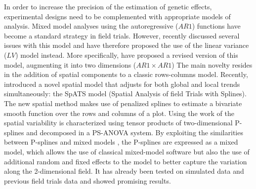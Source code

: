 In order to increase the precision of the estimation of genetic effects, experimental designs need to be complemented with appropriate models of analysis. Mixed model analyses using the autoregressive ($AR1$) functions   \parencite{cullis_spatial_1991} have become a standard strategy in field trials. 
However, \textcite{piepho_problems_2015} recently discussed several issues with this model and have therefore proposed the use of the linear variance ($LV$) model \parencite{williams_use_1988} instead. More specifically, \textcite{piepho_linear_2010} have proposed a revised version of this model, augmenting it into two dimensions ($AR1 \times AR1$) The main novelty resides in the addition of spatial components to a classic rows-columns model. Recently, 
\textcite{rodriguez-alvarez_correcting_2018} introduced a novel spatial model that adjusts for both global and local trends simultaneously: the SpATS model (Spatial Analysis of field Trials with Splines). The new spatial method makes use of penalized splines \parencite{eilers_flexible_1996} to estimate a bivariate smooth function over the rows and columns of a plot. Using the work of \textcite{lee_efficient_2013,lee_hwang_smoothing_2010,lee_p-spline_2011} the spatial variability is characterized using tensor products of two-dimensional P-splines \parencite{dierckx_curve_1995} and decomposed in a PS-ANOVA system. By exploiting the similarities between P-splines and mixed models \parencite{currie_flexible_2002,durban_adjusting_2001, wand_smoothing_2003}, the P-splines are expressed as a mixed model, which allows the use of classical mixed-model software but also the use of additional random and fixed effects to the model to better capture the variation along the 2-dimensional field.
It has already been tested on simulated data \parencite{rodriguez-alvarez_correcting_2018} and previous field trials data \parencite{lado_increased_2013} and showed promising results.\\

